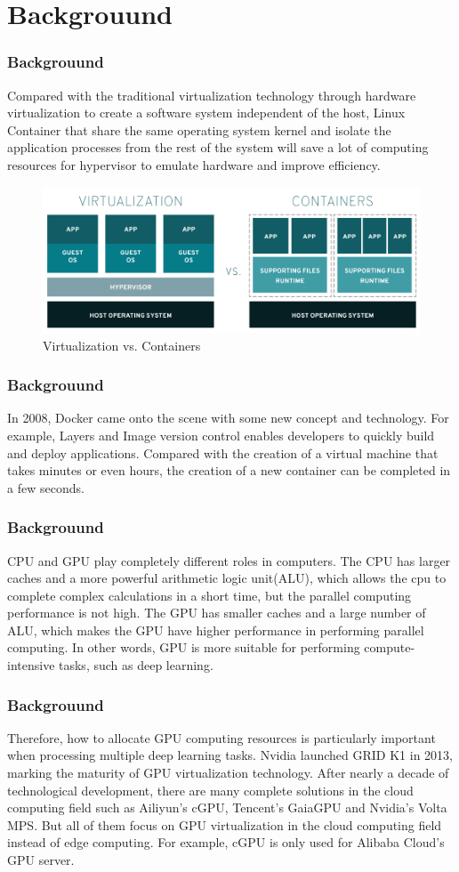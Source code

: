 \documentclass{beamer}
\begin{document}
\section{Backgrouund}
\begin{frame}
    \frametitle{Backgrouund}
    Compared with the traditional virtualization technology through hardware virtualization to create a software system independent of the host, Linux Container that share the same operating system kernel and isolate the application processes from the rest of the system will save a lot of computing resources for hypervisor to emulate hardware and improve efficiency.
    \begin{figure}[H]
        \centering
        \includegraphics[width=.7\textwidth]{img/report1.png}
        \caption{Virtualization vs. Containers}
        \label{img1} 
    \end{figure}
\end{frame}

\begin{frame}
    \frametitle{Backgrouund}
    In 2008, Docker came onto the scene with some new concept and technology. For example, Layers and Image version control enables developers to quickly build and deploy applications. Compared with the creation of a virtual machine that takes minutes or even hours, the creation of a new container can be completed in a few seconds.
\end{frame}

\begin{frame}
    \frametitle{Backgrouund}
    CPU and GPU play completely different roles in computers. The CPU has  larger caches and a more powerful arithmetic logic unit(ALU), which allows the cpu to complete complex calculations in a short time, but the parallel computing performance is not high. The GPU has smaller caches and a large number of ALU, which makes the GPU have higher performance in performing parallel computing. In other words, GPU is more suitable for performing compute-intensive tasks, such as deep learning.
\end{frame}

\begin{frame}
    \frametitle{Backgrouund}
    Therefore, how to allocate GPU computing resources is particularly important when processing multiple deep learning tasks. Nvidia launched GRID K1 in 2013, marking the maturity of GPU virtualization technology. After nearly a decade of technological development, there are many complete solutions in the cloud computing field such as Ailiyun's cGPU, Tencent's GaiaGPU and Nvidia's Volta MPS. But all of them  focus on GPU virtualization in the cloud computing field instead of edge computing. For example, cGPU is only used for Alibaba Cloud's GPU server.
\end{frame}
\end{document}
